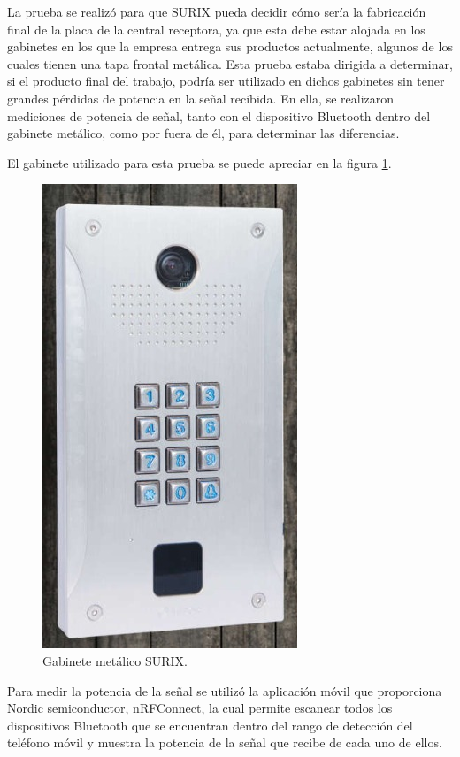 La prueba se realizó para que SURIX pueda decidir cómo sería la fabricación final de la placa de la central receptora, ya que esta debe estar alojada en los gabinetes en los que la empresa entrega sus productos actualmente, algunos de los cuales tienen una tapa frontal metálica. Esta prueba estaba dirigida a determinar, si el producto final del trabajo, podría ser utilizado en dichos gabinetes sin tener grandes pérdidas de potencia en la señal recibida. En ella, se realizaron mediciones de potencia de señal, tanto con el dispositivo Bluetooth dentro del gabinete metálico, como por fuera de él, para determinar las diferencias.

El gabinete utilizado para esta prueba se puede apreciar en la figura \ref{fig:GMetalico}.

\begin{figure}[htpb]
	\centering
	\includegraphics[scale=0.4]{./Figures/gabMet.jpeg}
	\caption{Gabinete metálico SURIX.}
	\label{fig:GMetalico}
\end{figure}

Para medir la potencia de la señal se utilizó la aplicación móvil que proporciona Nordic semiconductor, nRFConnect, la cual permite escanear todos los dispositivos Bluetooth que se encuentran dentro del rango de detección del teléfono móvil y muestra la potencia de la señal que recibe de cada uno de ellos.

